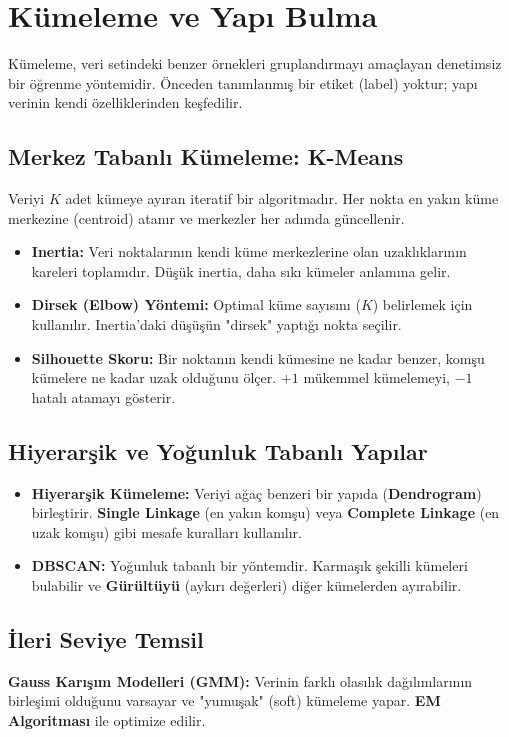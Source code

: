\documentclass[12pt,a4paper]{article}
\begin{document}
\newpage
\section{Kümeleme ve Yapı Bulma}
Kümeleme, veri setindeki benzer örnekleri gruplandırmayı amaçlayan denetimsiz bir öğrenme yöntemidir. Önceden tanımlanmış bir etiket (label) yoktur; yapı verinin kendi özelliklerinden keşfedilir.

\subsection{Merkez Tabanlı Kümeleme: K-Means}
Veriyi $K$ adet kümeye ayıran iteratif bir algoritmadır. Her nokta en yakın küme merkezine (centroid) atanır ve merkezler her adımda güncellenir.
\begin{itemize}
    \item \textbf{Inertia:} Veri noktalarının kendi küme merkezlerine olan uzaklıklarının kareleri toplamıdır. Düşük inertia, daha sıkı kümeler anlamına gelir.
    \item \textbf{Dirsek (Elbow) Yöntemi:} Optimal küme sayısını ($K$) belirlemek için kullanılır. Inertia'daki düşüşün "dirsek" yaptığı nokta seçilir.
    \item \textbf{Silhouette Skoru:} Bir noktanın kendi kümesine ne kadar benzer, komşu kümelere ne kadar uzak olduğunu ölçer. $+1$ mükemmel kümelemeyi, $-1$ hatalı atamayı gösterir.
\end{itemize}

\subsection{Hiyerarşik ve Yoğunluk Tabanlı Yapılar}
\begin{itemize}
    \item \textbf{Hiyerarşik Kümeleme:} Veriyi ağaç benzeri bir yapıda (\textbf{Dendrogram}) birleştirir. \textbf{Single Linkage} (en yakın komşu) veya \textbf{Complete Linkage} (en uzak komşu) gibi mesafe kuralları kullanılır.
    \item \textbf{DBSCAN:} Yoğunluk tabanlı bir yöntemdir. Karmaşık şekilli kümeleri bulabilir ve \textbf{Gürültüyü} (aykırı değerleri) diğer kümelerden ayırabilir.
\end{itemize}

\subsection{İleri Seviye Temsil}
\textbf{Gauss Karışım Modelleri (GMM):} Verinin farklı olasılık dağılımlarının birleşimi olduğunu varsayar ve "yumuşak" (soft) kümeleme yapar. \textbf{EM Algoritması} ile optimize edilir.
\end{document}
